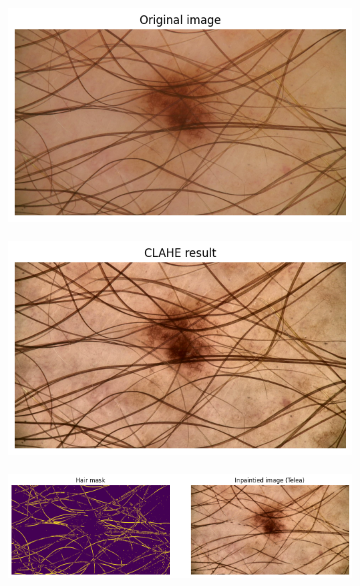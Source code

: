 \begin{figure}[p]
     \centering
     \begin{subfigure}{0.45\textwidth}
         \centering
         \includegraphics[width=\textwidth]{figures/estimation/estimation_A.png}
         \caption{}
         \label{fig:ss_1}
		 \vspace{0.5em}
     \end{subfigure}
     \hfill
     \begin{subfigure}{0.45\textwidth}
         \centering
         \includegraphics[width=\textwidth]{figures/estimation/estimation_B.png}
         \caption{}
         \label{fig:ss_2}
		\vspace{0.5em}
     \end{subfigure}
    \hfill
     \begin{subfigure}{0.90\textwidth}
         \centering
         \includegraphics[width=\textwidth]{figures/estimation/estimation_C.png}

\end{subfigure}
\end{figure}
